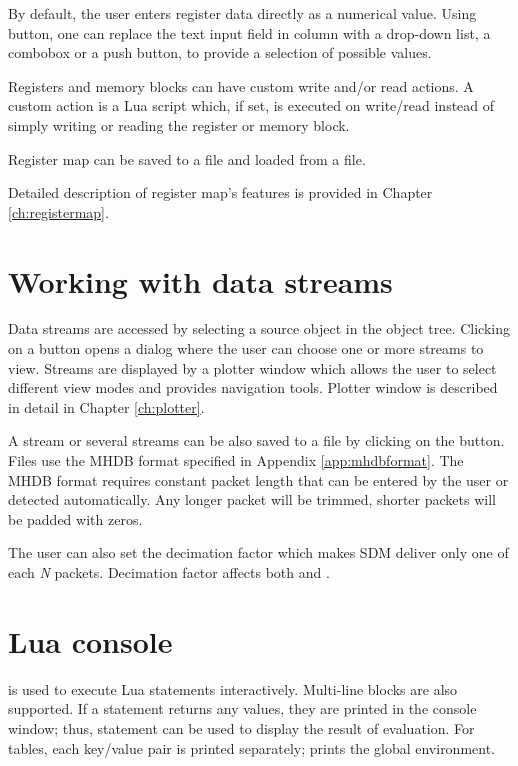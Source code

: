\documentclass[a4paper,12pt,twoside,extrafontsizes]{memoir}
\begin{document}
By default, the user enters register data directly as a numerical value. Using  button, one can replace the text input field in  column with a drop-down list, a combobox or a push button, to provide a selection of possible values.

Registers and memory blocks can have custom write and/or read actions. A custom action is a Lua script which, if set, is executed on write/read instead of simply writing or reading the register or memory block.

Register map can be saved to a file and loaded from a file.

Detailed description of register map's features is provided in Chapter \ref{ch:registermap}.

\section{Working with data streams}

Data streams are accessed by selecting a source object in the object tree. Clicking on a  button opens a dialog where the user can choose one or more streams to view. Streams are displayed by a plotter window which allows the user to select different view modes and provides navigation tools. Plotter window is described in detail in Chapter \ref{ch:plotter}.

A stream or several streams can be also saved to a file by clicking on the  button. Files use the MHDB format specified in Appendix \ref{app:mhdbformat}. The MHDB format requires constant packet length that can be entered by the user or detected automatically. Any longer packet will be trimmed, shorter packets will be padded with zeros.

The user can also set the decimation factor which makes SDM deliver only one of each \emph{N} packets. Decimation factor affects both  and .

\section{Lua console}

 is used to execute Lua statements interactively. Multi-line blocks are also supported. If a statement returns any values, they are printed in the console window; thus,  statement can be used to display the result of  evaluation. For tables, each key/value pair is printed separately;  prints the global environment.
\end{document}
